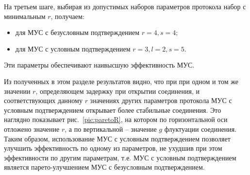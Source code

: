На третьем шаге, выбирая из допустимых наборов параметров протокола набор с минимальным $r$, получаем:
\begin{itemize}
  \item для МУС с безусловным подтверждением $r=4, s=4$;
  \item для МУС с условным подтверждением $r=3, l=2, s=5$.
\end{itemize}

Эти параметры обеспечивают наивысшую эффективность МУС.

Из полученных в этом разделе результатов видно, что при при одном и том же значении $r$, определяющем задержку при открытии соединения, и соответствующих данному $r$ значениях других параметров протокола МУС с условным подтверждением открывает более стабильные соединения. Это наглядно показывает рис.~\ref{pic:paretoR}, на котором по горизонтальной оси отложено значение $r$, а по вертикальной -- значение $g$ флуктуации соединения.
Таким образом, использование МУС с условным подтверждением позволяет улучшить эффективность по одному из параметров, не ухудшив при этом эффективности по другим параметрам, т.е. МУС с условным подтверждением является парето-улучшением МУС с безусловным подтверждением.



